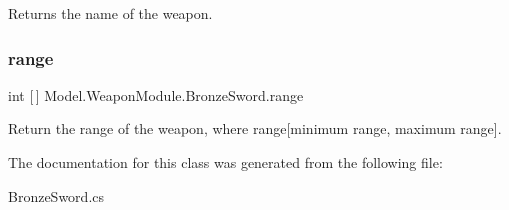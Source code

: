 Returns the name of the weapon. \hypertarget{class_model_1_1_weapon_module_1_1_bronze_sword_aa4760d927116d93aa66a0d29779bbea2}{}\label{class_model_1_1_weapon_module_1_1_bronze_sword_aa4760d927116d93aa66a0d29779bbea2} 
\subsubsection{\texorpdfstring{range}{range}}
{\footnotesize\ttfamily int \mbox{[}$\,$\mbox{]} Model.\+Weapon\+Module.\+Bronze\+Sword.\+range\hspace{0.3cm}{\ttfamily [get]}}

Return the range of the weapon, where range\mbox{[}minimum range, maximum range\mbox{]}. 

The documentation for this class was generated from the following file\+:\begin{DoxyCompactItemize}
\item 
Bronze\+Sword.\+cs\end{DoxyCompactItemize}
